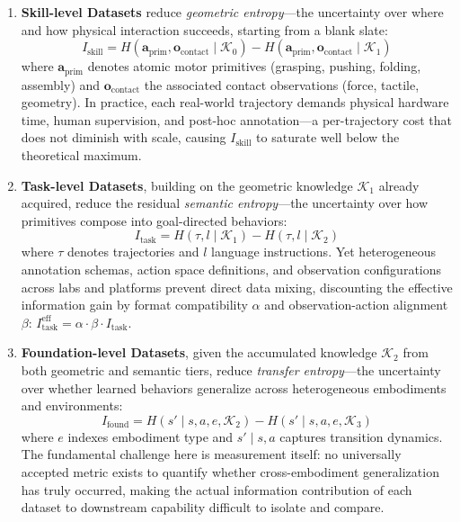 \documentclass[acmsmall,screen,review,anonymous]{acmart}
\begin{document}
\begin{enumerate}[leftmargin=*, nosep]
\item \textbf{Skill-level Datasets} reduce \emph{geometric entropy}---the uncertainty over where and how physical interaction succeeds, starting from a blank slate:
\begin{equation}\label{eq:skill_info}
I_{\text{skill}} = H(\mathbf{a}_{\text{prim}}, \mathbf{o}_{\text{contact}} \mid \mathcal{K}_0) - H(\mathbf{a}_{\text{prim}}, \mathbf{o}_{\text{contact}} \mid \mathcal{K}_1)
\end{equation}
where $\mathbf{a}_{\text{prim}}$ denotes atomic motor primitives (grasping, pushing, folding, assembly) and $\mathbf{o}_{\text{contact}}$ the associated contact observations (force, tactile, geometry). In practice, each real-world trajectory demands physical hardware time, human supervision, and post-hoc annotation---a per-trajectory cost that does not diminish with scale, causing $I_{\text{skill}}$ to saturate well below the theoretical maximum.

\item \textbf{Task-level Datasets}, building on the geometric knowledge $\mathcal{K}_1$ already acquired, reduce the residual \emph{semantic entropy}---the uncertainty over how primitives compose into goal-directed behaviors:
\begin{equation}\label{eq:task_info}
I_{\text{task}} = H(\tau, l \mid \mathcal{K}_1) - H(\tau, l \mid \mathcal{K}_2)
\end{equation}
where $\tau$ denotes trajectories and $l$ language instructions. Yet heterogeneous annotation schemas, action space definitions, and observation configurations across labs and platforms prevent direct data mixing, discounting the effective information gain by format compatibility $\alpha$ and observation-action alignment $\beta$: $I_{\text{task}}^{\text{eff}} = \alpha \cdot \beta \cdot I_{\text{task}}$.

\item \textbf{Foundation-level Datasets}, given the accumulated knowledge $\mathcal{K}_2$ from both geometric and semantic tiers, reduce \emph{transfer entropy}---the uncertainty over whether learned behaviors generalize across heterogeneous embodiments and environments:
\begin{equation}\label{eq:found_info}
I_{\text{found}} = H(s' \mid s, a, e, \mathcal{K}_2) - H(s' \mid s, a, e, \mathcal{K}_3)
\end{equation}
where $e$ indexes embodiment type and $s' \mid s, a$ captures transition dynamics. The fundamental challenge here is measurement itself: no universally accepted metric exists to quantify whether cross-embodiment generalization has truly occurred, making the actual information contribution of each dataset to downstream capability difficult to isolate and compare.
\end{enumerate}
\end{document}
